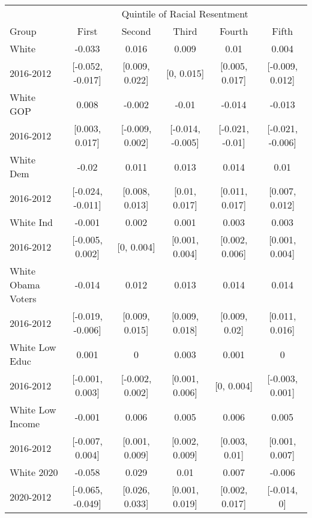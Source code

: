 \begin{tabular}{l|ccccc}
\hline\hline
      & \multicolumn{5}{c}{Quintile of Racial Resentment} \\
Group & First & Second & Third & Fourth & Fifth \\
\hline
White  &  -0.033 & 0.016 & 0.009 & 0.01 & 0.004 \\ 
 2016-2012 & [-0.052, -0.017] & [0.009, 0.022] & [0, 0.015] & [0.005, 0.017] & [-0.009, 0.012] \\ 
 \hline
White GOP  &  0.008 & -0.002 & -0.01 & -0.014 & -0.013 \\ 
 2016-2012 & [0.003, 0.017] & [-0.009, 0.002] & [-0.014, -0.005] & [-0.021, -0.01] & [-0.021, -0.006] \\ 

White Dem  &  -0.02 & 0.011 & 0.013 & 0.014 & 0.01 \\ 
 2016-2012 & [-0.024, -0.011] & [0.008, 0.013] & [0.01, 0.017] & [0.011, 0.017] & [0.007, 0.012] \\ 

White Ind  &  -0.001 & 0.002 & 0.001 & 0.003 & 0.003 \\ 
 2016-2012 & [-0.005, 0.002] & [0, 0.004] & [0.001, 0.004] & [0.002, 0.006] & [0.001, 0.004] \\ 

White Obama Voters  &  -0.014 & 0.012 & 0.013 & 0.014 & 0.014 \\ 
 2016-2012 & [-0.019, -0.006] & [0.009, 0.015] & [0.009, 0.018] & [0.009, 0.02] & [0.011, 0.016] \\ 
 \hline
White Low Educ  &  0.001 & 0 & 0.003 & 0.001 & 0 \\ 
 2016-2012 & [-0.001, 0.003] & [-0.002, 0.002] & [0.001, 0.006] & [0, 0.004] & [-0.003, 0.001] \\ 

White Low Income  &  -0.001 & 0.006 & 0.005 & 0.006 & 0.005 \\ 
 2016-2012 & [-0.007, 0.004] & [0.001, 0.009] & [0.002, 0.009] & [0.003, 0.01] & [0.001, 0.007] \\ 
 \hline
White 2020  &  -0.058 & 0.029 & 0.01 & 0.007 & -0.006 \\ 
 2020-2012 & [-0.065, -0.049] & [0.026, 0.033] & [0.001, 0.019] & [0.002, 0.017] & [-0.014, 0] \\ 
 \hline
\hline
\end{tabular}
